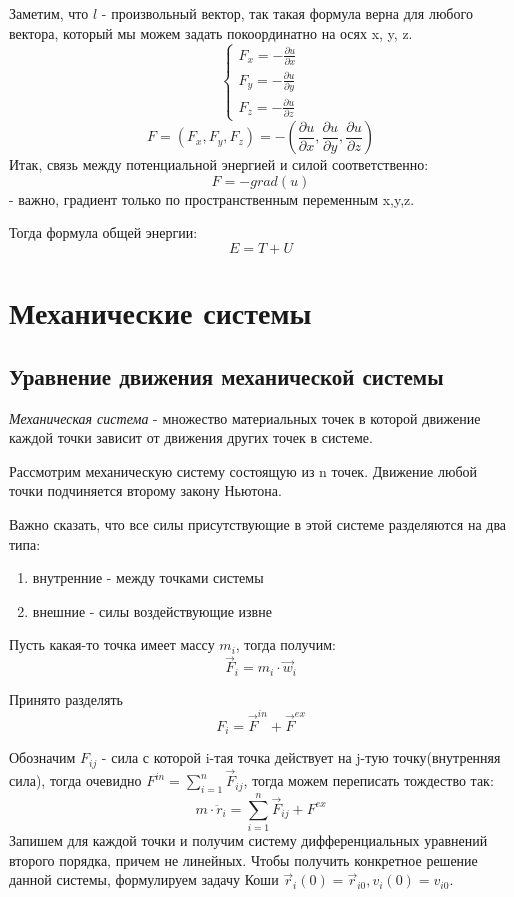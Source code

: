 \documentclass[12pt,a4paper]{report}
\begin{document}
\vspace{3px}

Заметим, что $l$ - произвольный вектор, так такая формула верна для любого вектора, который мы можем задать покоординатно на осях x, y, z.
\[
    \begin{cases}
        F_x = -\frac{\partial u}{\partial x} \\
        F_y = -\frac{\partial u}{\partial y} \\
        F_z = -\frac{\partial u}{\partial z}
    \end{cases}
\]
\[  F = (F_x, F_y, F_z) = -(\frac{\partial u}{\partial x}, \frac{\partial u}{\partial y}, \frac{\partial u}{\partial z})\]
Итак, связь между потенциальной энергией и силой соответственно:
\[ F = -grad(u)\] - важно, градиент только по пространственным переменным x,y,z.

Тогда формула общей энергии:
\[E = T + U\]
\section{Механические системы}
\subsection{Уравнение движения механической системы}
\textit{ Механическая система} - множество материальных точек в которой движение каждой точки зависит от движения других точек в системе.

\vspace{5px}

Рассмотрим механическую систему состоящую из n точек. Движение любой точки подчиняется второму закону Ньютона.

\vspace{5px}

Важно сказать, что все силы присутствующие в этой системе разделяются на два типа:
\begin{enumerate}
    \item внутренние - между точками системы
    \item внешние - силы воздействующие извне
\end{enumerate}
Пусть какая-то точка имеет массу $m_i$, тогда получим: \[\vec F_i = m_i \cdot \vec w_i\]

Принято разделять \[ F_i = \vec F^{in} + \vec F^{ex}\]

Обозначим $F_{ij}$ - сила с которой i-тая точка действует на j-тую точку(внутренняя сила), тогда очевидно $F^{in} = \sum_{i=1}^n \vec F_{ij}$, тогда можем переписать тождество так:
\[ m \cdot \ddot r_i = \sum_{i=1}^n \vec F_{ij} + F^{ex} \]
Запишем для каждой точки и получим систему дифференциальных уравнений второго порядка, причем не линейных. Чтобы получить конкретное решение данной системы, формулируем задачу Коши $\vec r_i(0) = \vec r_{i0} , v_i(0) = v_{i0}$.
\end{document}
